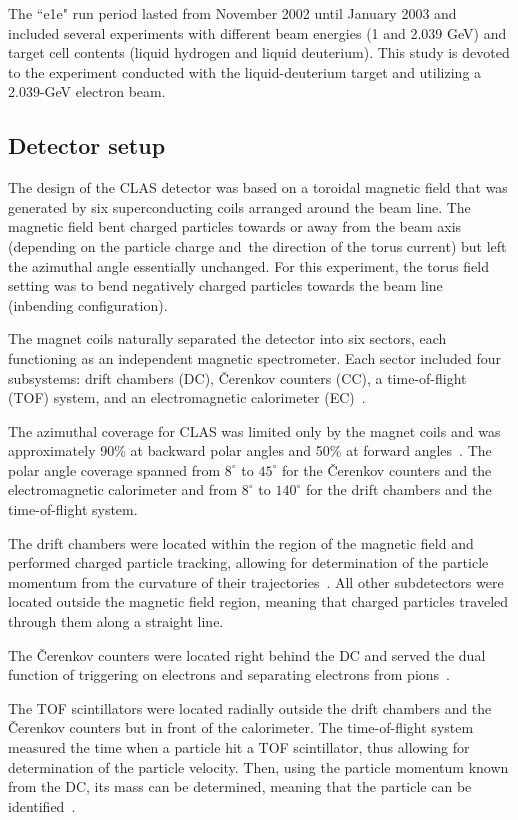 \documentclass[prc,twocolumn,superscriptaddress,showpacs,amssymb,amsmath,amsfonts,aps,nofootinbib]{revtex4-1}
\begin{document}
The ``e1e" run period lasted from November 2002 until January 2003 and included several experiments with different beam energies (1 and 2.039 GeV) and target cell contents (liquid hydrogen and liquid deuterium). This study is devoted to the experiment conducted with the liquid-deuterium target and utilizing a 2.039-GeV electron beam. 

\subsection{Detector setup}

The design of the CLAS detector was based on a toroidal magnetic field that was generated by six superconducting coils arranged around the beam line. The magnetic field bent charged particles towards or away from the beam axis (depending on the particle charge and~the direction of the torus current) but left the azimuthal angle essentially unchanged. For this experiment, the torus field setting was to bend negatively charged particles towards the beam line (inbending configuration).

The magnet coils naturally separated the detector into six sectors, each functioning as an independent magnetic spectrometer. Each sector included four subsystems: drift chambers (DC), \v Cerenkov counters (CC), a time-of-flight (TOF) system, and an electromagnetic calorimeter (EC)~\cite{Mecking:2003zu}.


The azimuthal coverage for CLAS was limited only by the magnet coils and was approximately 90\% at backward polar angles and 50\% at forward angles~\cite{Amarian:2001zs}. The polar angle coverage spanned from $8^{\circ}\mathrm{}$ to $45^{\circ}\mathrm{}$ for the \v Cerenkov counters and the electromagnetic calorimeter and from $8^{\circ}\mathrm{}$ to $140^{\circ}\mathrm{}$ for the drift chambers and the time-of-flight system.

The drift chambers were located within the region of the magnetic field and performed charged particle tracking, allowing for determination of the particle momentum from the curvature of their trajectories~\cite{Mestayer:2000we}. All other subdetectors were located outside the magnetic field region, meaning that charged particles traveled through them along a straight line.

The \v Cerenkov counters were located right behind the DC and served the dual function of triggering on electrons and separating electrons from pions~\cite{Adams:2001kk}. 

The TOF scintillators were located radially outside the drift chambers and the \v Cerenkov counters but in front of the calorimeter. The time-of-flight system measured the time when a particle hit a TOF scintillator, thus allowing for determination of the particle velocity. Then, using the particle momentum known from the DC, its mass can be determined, meaning that the particle can be identified~\cite{Smith:1999ii, clas_tof_paddles}.
\end{document}
